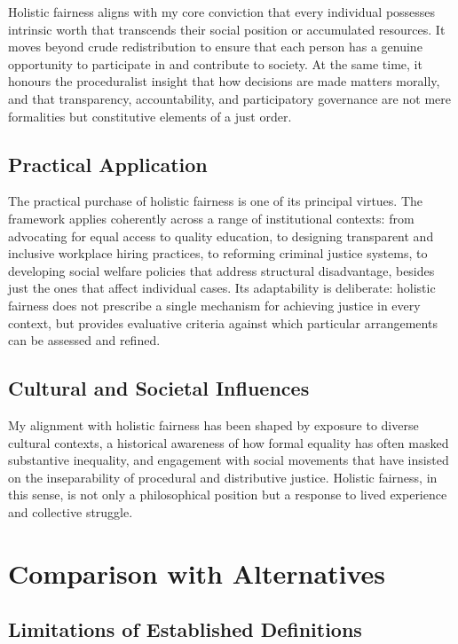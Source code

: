 \documentclass[11pt,showkeys]{essay}
\begin{document}
Holistic fairness aligns with my core conviction that every individual possesses intrinsic worth that transcends their social position or accumulated resources. It moves beyond crude redistribution to ensure that each person has a genuine opportunity to participate in and contribute to society. At the same time, it honours the proceduralist insight that how decisions are made matters morally, and that transparency, accountability, and participatory governance are not mere formalities but constitutive elements of a just order.

\subsection{Practical Application}

The practical purchase of holistic fairness is one of its principal virtues. The framework applies coherently across a range of institutional contexts: from advocating for equal access to quality education, to designing transparent and inclusive workplace hiring practices, to reforming criminal justice systems, to developing social welfare policies that address structural disadvantage, besides just the ones that affect individual cases. Its adaptability is deliberate: holistic fairness does not prescribe a single mechanism for achieving justice in every context, but provides evaluative criteria against which particular arrangements can be assessed and refined.

\subsection{Cultural and Societal Influences}

My alignment with holistic fairness has been shaped by exposure to diverse cultural contexts, a historical awareness of how formal equality has often masked substantive inequality, and engagement with social movements that have insisted on the inseparability of procedural and distributive justice. Holistic fairness, in this sense, is not only a philosophical position but a response to lived experience and collective struggle.

\section{Comparison with Alternatives}

\subsection{Limitations of Established Definitions}
\end{document}
